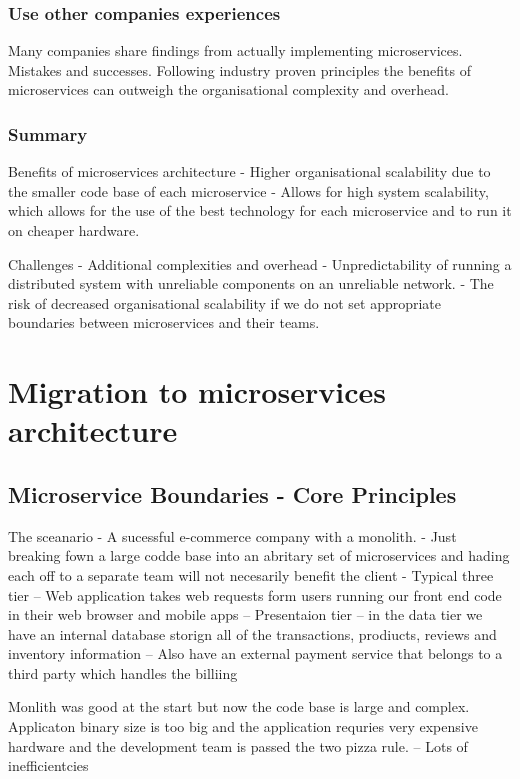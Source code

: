 \documentclass[a4paper, 11pt]{book}
\begin{document}
    \subsubsection{Use other companies experiences}
    Many companies share findings from actually implementing microservices. Mistakes and successes.
    Following industry proven principles the benefits of microservices can outweigh the organisational complexity and overhead.

    \subsubsection{Summary}
    Benefits of microservices architecture
    - Higher organisational scalability due to the smaller code base of each microservice
    - Allows for high system scalability, which allows for the use of the best technology for each microservice and to run it on cheaper hardware.

    Challenges
    - Additional complexities and overhead
    - Unpredictability of running a distributed system with unreliable components on an unreliable network.
    - The risk of decreased organisational scalability if we do not set appropriate boundaries between microservices and their teams.


    \section{Migration to microservices architecture}

    \subsection{Microservice Boundaries - Core Principles}
    The sceanario - A sucessful e-commerce company with a monolith.
    - Just breaking fown a large codde base into an abritary set of microservices and hading each off to a separate team will not necesarily benefit the client
    - Typical three tier
    -- Web application takes web requests form users running our front end code in their web browser and mobile apps -- Presentaion tier
    -- in the data tier we have an internal database storign all of the transactions, prodiucts, reviews and inventory information
    -- Also have an external payment service that belongs to a third party which handles the billiing

    Monlith was good at the start but now the code base is large and complex.
    Applicaton binary size is too big and the application requries very expensive hardware and the development team is passed the two pizza rule.
    -- Lots of inefficientcies
\end{document}
